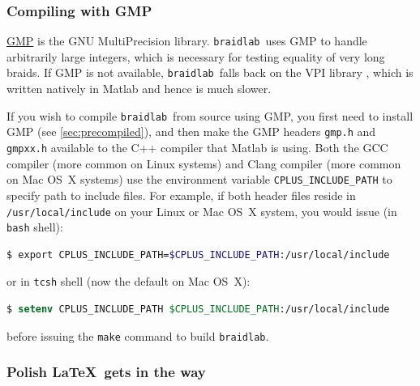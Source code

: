\documentclass[12pt]{article}
\newcommand{\braidlab}{\texttt{braidlab}}%
\begin{document}
\subsubsection{Compiling with GMP}
\label{sec:gmp}

%
\href{https://gmplib.org/}{GMP} is the GNU MultiPrecision library.  \braidlab\
uses GMP to handle arbitrarily large integers, which is necessary for testing
equality of very long braids.  If GMP is not available, \braidlab\ falls back
on the VPI library \citep{vpi}, which is written natively in Matlab and hence
is much slower.

If you wish to compile \braidlab\ from source using GMP, you first need to
install GMP (see \ref{sec:precompiled}), and then make the GMP headers
\lstinline{gmp.h} and \lstinline{gmpxx.h} available to the C++ compiler that
Matlab is using. Both the %
%
GCC compiler (more common on Linux %
%
systems) and %
%
Clang compiler (more common on Mac OS~X systems) %
%
use the environment variable \lstinline{CPLUS_INCLUDE_PATH} to specify path to
include files. For example, if both header files reside in
\lstinline{/usr/local/include} on your Linux or Mac OS~X system, you would
issue (in \lstinline{bash} shell):
\begin{lstlisting}[frame=single,framerule=0pt,escapechar=*,%
  language=bash,backgroundcolor=\color{white}]
$ export CPLUS_INCLUDE_PATH=$CPLUS_INCLUDE_PATH:/usr/local/include
\end{lstlisting}
or in \lstinline{tcsh} shell (now the default on Mac OS~X):
\begin{lstlisting}[frame=single,framerule=0pt,escapechar=*,%
  language=csh,backgroundcolor=\color{white}]
$ setenv CPLUS_INCLUDE_PATH $CPLUS_INCLUDE_PATH:/usr/local/include
\end{lstlisting}
before issuing the \lstinline{make} command to build \lstinline{braidlab}.

%


\subsubsection{Polish \LaTeX\ gets in the way}
\end{document}
